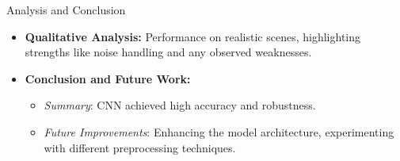 \documentclass{beamer}
\begin{document}
\begin{frame}{Analysis and Conclusion}
  \begin{itemize}
    \item \textbf{Qualitative Analysis:} Performance on realistic scenes, highlighting strengths like noise handling and any observed weaknesses.
    \item \textbf{Conclusion and Future Work:}
      \begin{itemize}
        \item \textit{Summary}: CNN achieved high accuracy and robustness.
        \item \textit{Future Improvements}: Enhancing the model architecture, experimenting with different preprocessing techniques.
      \end{itemize}
  \end{itemize}
\end{frame}
\end{document}
